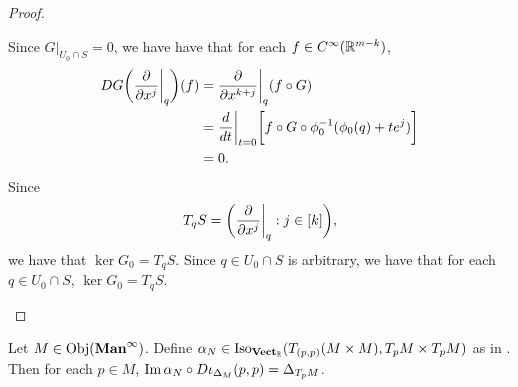 \documentclass{book}
\begin{document}
\begin{proof}
\begin{itemize}
\begin{itemize}
			\end{itemize}
			Since $G|_{U_0 \cap S} = 0$, we have have that for each $f \in C^{\infty}(\mathbb{R}^{m-k})$,
			\begin{align*}
				DG \bigg( \frac{\partial}{\partial x^j} \bigg|_q \bigg)(f)
				& = \frac{\partial}{\partial x^{k+j}} \bigg|_q (f \circ G) \\
				& = \frac{d}{d t} \bigg|_{t = 0} \bigg[f \circ G \circ \phi_0^{-1}(\phi_0(q) + t e^j) \bigg] \\
				& = 0.
			\end{align*}
			Since 
			$$T_q S = \bigg(\frac{\partial}{\partial x^j} \bigg|_q : j \in [k] \bigg),$$
			we have that $\ker G_0 = T_q S$. Since $q \in U_0 \cap S$ is arbitrary, we have that for each $q \in U_0 \cap S$, $\ker G_0 = T_qS$.
		\end{itemize}
	\end{proof}

\begin{ex} 
	Let $M \in \operatorname{Obj}(\operatorname*{\text{\textbf{Man}}^{\infty}})$. Define $\alpha_N \in \operatorname{Iso}_{\operatorname*{\text{\textbf{Vect}}_{\mathbb{R}}}}(T_{(p,p)}(M \times M), T_pM \times T_pM)$ as in . Then for each $p \in M$, $\text{Im} \, \alpha_N \circ D\iota_{\Delta_M}(p,p) = \Delta_{T_p M}$.
\end{ex}
\end{document}
